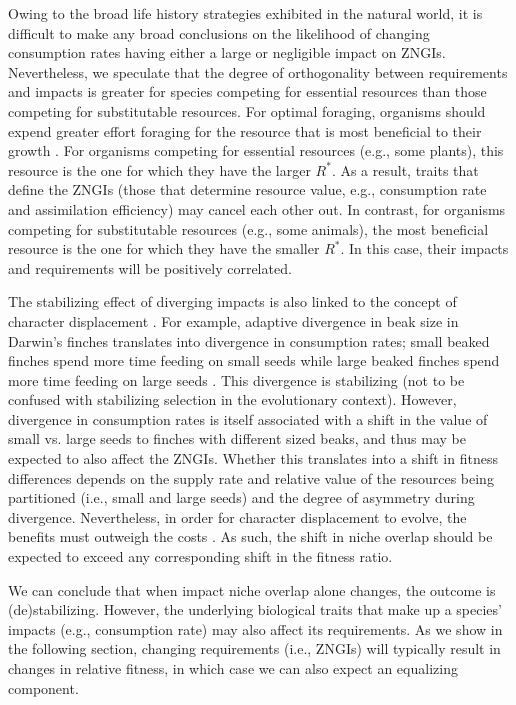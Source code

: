 Owing to the broad life history strategies exhibited in the natural world, it is difficult to make any broad conclusions on the likelihood of changing consumption rates having either a large or negligible impact on ZNGIs. Nevertheless, we speculate that the degree of orthogonality between requirements and impacts is greater for species competing for essential resources than those competing for substitutable resources. For optimal foraging, organisms should expend greater effort foraging for the resource that is most beneficial to their growth \citep{tilman1982, Vincent1996, Chase2003}. For organisms competing for essential resources (e.g., some plants), this resource is the one for which they have the larger $R^{*}$. As a result, traits that define the ZNGIs (those that determine resource value, e.g., consumption rate and assimilation efficiency) may cancel each other out. In contrast, for organisms competing for substitutable resources (e.g., some animals), the most beneficial resource is the one for which they have the smaller $R^{*}$. In this case, their impacts and requirements will be positively correlated.    
\par


The stabilizing effect of diverging impacts is also linked to the concept of character displacement \citep{brown1956, pfennig2012}. For example, adaptive divergence in beak size in Darwin's finches translates into divergence in consumption rates; small beaked finches spend more time feeding on small seeds while large beaked finches spend more time feeding on large seeds \citep{Grant2006}. This divergence is stabilizing (not to be confused with stabilizing selection in the evolutionary context). However, divergence in consumption rates is itself associated with a shift in the value of small vs. large seeds to finches with different sized beaks, and thus may be expected to also affect the ZNGIs. Whether this translates into a shift in fitness differences depends on the supply rate and relative value of the resources being partitioned (i.e., small and large seeds) and the degree of asymmetry during divergence. Nevertheless, in order for character displacement to evolve, the benefits must outweigh the costs \citep{pfennig2012}. As such, the shift in niche overlap should be expected to exceed any corresponding shift in the fitness ratio. 
\par


We can conclude that when impact niche overlap alone changes, the outcome is (de)stabilizing. However, the underlying biological traits that make up a species' impacts (e.g., consumption rate) may also affect its requirements. As we show in the following section, changing requirements (i.e., ZNGIs) will typically result in changes in relative fitness, in which case we can also expect an equalizing component.
\par



